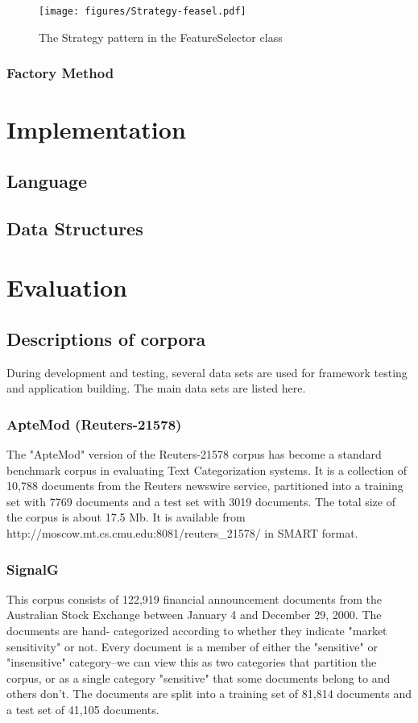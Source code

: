 \documentclass[a4paper]{report}
\begin{document}
\begin{figure}
\texttt{[image: figures/Strategy-feasel.pdf]}
\caption{The Strategy pattern in the FeatureSelector class}
\label{Strategy-feasel}
\end{figure}

\subsection{Factory Method}

\chapter{Implementation}

\section{Language}
\section{Data Structures}

\chapter{Evaluation}

\section{Descriptions of corpora}
During development and testing, several data sets are used for
framework testing and application building.  The main data sets are
listed here.


\subsection{ApteMod (Reuters-21578)}


The "ApteMod" version of the Reuters-21578 corpus has become a
standard benchmark corpus in evaluating Text Categorization systems.
It is a collection of 10,788 documents from the Reuters newswire
service, partitioned into a training set with 7769 documents and a
test set with 3019 documents.  The total size of the corpus is about
17.5 Mb.  It is available from
http://moscow.mt.cs.cmu.edu:8081/reuters\_21578/ in SMART format.


\subsection{SignalG}
This corpus consists of 122,919 financial announcement documents from
the Australian Stock Exchange between January 4 and December 29, 2000.
The documents are hand- categorized according to whether they indicate
"market sensitivity" or not.  Every document is a member of either the
"sensitive" or "insensitive" category--we can view this as two
categories that partition the corpus, or as a single category
"sensitive" that some documents belong to and others don't.  The
documents are split into a training set of 81,814 documents and a test
set of 41,105 documents.
\end{document}
